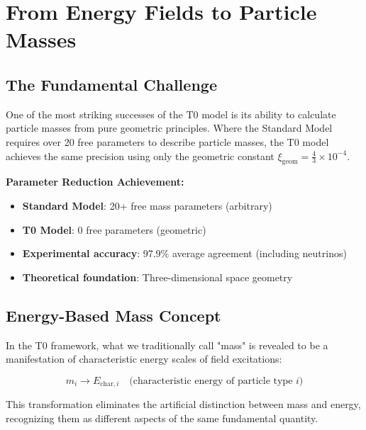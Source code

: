 \documentclass[12pt,a4paper]{article}
\newcommand{\xigeom}{\xi_{\text{geom}}}
\begin{document}
	\section{From Energy Fields to Particle Masses}
	\label{sec:energy_fields_to_masses}
	
	\subsection{The Fundamental Challenge}
	\label{subsec:fundamental_challenge}
	
	One of the most striking successes of the T0 model is its ability to calculate particle masses from pure geometric principles. Where the Standard Model requires over 20 free parameters to describe particle masses, the T0 model achieves the same precision using only the geometric constant $\xigeom = \frac{4}{3} \times 10^{-4}$.
	
	\begin{tcolorbox}[colback=green!5!white,colframe=green!75!black,title=Mass Revolution]
		\textbf{Parameter Reduction Achievement:}
		\begin{itemize}
			\item \textbf{Standard Model}: 20+ free mass parameters (arbitrary)
			\item \textbf{T0 Model}: 0 free parameters (geometric)
			\item \textbf{Experimental accuracy}: 97.9\% average agreement (including neutrinos)
			\item \textbf{Theoretical foundation}: Three-dimensional space geometry
		\end{itemize}
	\end{tcolorbox}
	
	\subsection{Energy-Based Mass Concept}
	\label{subsec:energy_based_mass}
	
	In the T0 framework, what we traditionally call "mass" is revealed to be a manifestation of characteristic energy scales of field excitations:
	
	\begin{equation}
		\boxed{m_i \rightarrow E_{\text{char},i} \quad \text{(characteristic energy of particle type } i\text{)}}
		\label{eq:mass_to_energy}
	\end{equation}
	
	This transformation eliminates the artificial distinction between mass and energy, recognizing them as different aspects of the same fundamental quantity.
	
\end{document}
